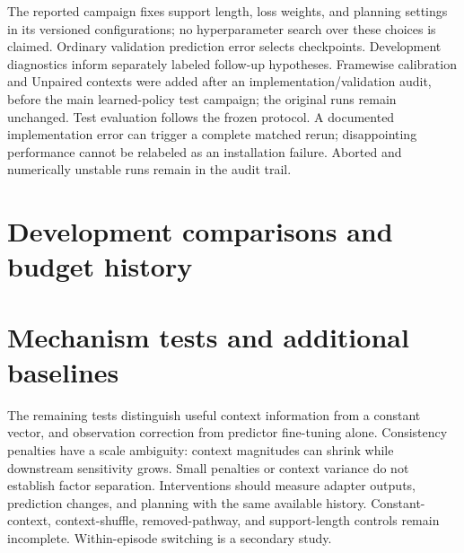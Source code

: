 The reported campaign fixes support length, loss weights, and planning
settings in its versioned configurations; no hyperparameter search over these
choices is claimed. Ordinary validation prediction error selects checkpoints.
Development diagnostics inform separately labeled follow-up hypotheses.
Framewise calibration and Unpaired contexts were added after an implementation/validation
audit, before the main learned-policy test campaign; the original runs remain
unchanged. Test evaluation follows the frozen protocol. A documented implementation
error can trigger a complete matched rerun; disappointing performance
cannot be relabeled as an installation failure. Aborted and numerically
unstable runs remain in the audit trail.

\FloatBarrier
\section{Development comparisons and budget history}
\label{sec:development}

\FloatBarrier


\section{Mechanism tests and additional baselines}
\label{sec:mechanism}
The remaining tests distinguish useful context information from a constant
vector, and observation correction from predictor fine-tuning alone.
Consistency penalties have a scale ambiguity: context magnitudes can shrink
while downstream sensitivity grows. Small penalties or context variance do
not establish factor separation. Interventions should measure adapter
outputs, prediction changes, and planning with the same available history.
Constant-context, context-shuffle, removed-pathway, and support-length
controls remain incomplete. Within-episode switching is a secondary study.

